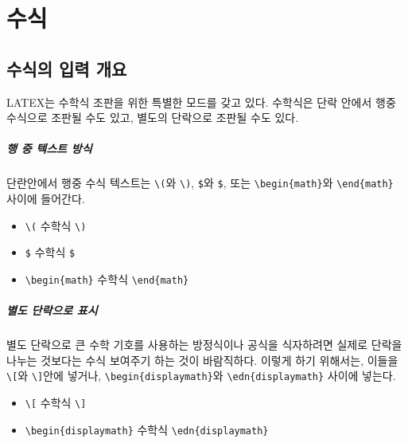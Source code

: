 		
\newpage
\chapter{수식}
	
		\minitoc		
		


%
%
%
\newpage
\section{수식의 입력 개요}

	LATEX는 수학식 조판을 위한 특별한 모드를 갖고 있다.
	수학식은 단락 안에서 행중 수식으로 조판될 수도 있고, 별도의 단락으로 조판될 수도 있다.

	\paragraph{행 중 텍스트 방식}
	단란안에서 행중 수식 텍스트는 \verb|\(|와 \verb|\)|, \verb|$|와 \verb|$|, 또는 
	\verb|\begin{math}|와 \verb|\end{math}| 사이에 들어간다.

	\begin{itemize}
	\item 	\verb|\(| 수학식 \verb|\)|
	\item 	\verb|$| 수학식 \verb|$|
	\item 	\verb|\begin{math}| 수학식 \verb|\end{math}|
	\end{itemize}


	\paragraph{별도 단락으로 표시}
	별도 단락으로 큰 수학 기호를 사용하는 방정식이나 공식을 식자하려면
	실제로 단락을 나누는 것보다는 수식 보여주기 하는 것이 바람직하다.
	이렇게 하기 위해서는, 이들을 \verb|\[|와 \verb|\]|안에 넣거나, 
	\verb|\begin{displaymath}|와 \verb|\edn{displaymath}| 사이에 넣는다.

	\begin{itemize}
	\item 	\verb|\[| 수학식 \verb|\]|
	\item 	\verb|\begin{displaymath}| 수학식 \verb|\edn{displaymath}|
	\end{itemize}


